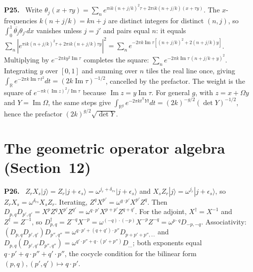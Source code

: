 \documentclass[11pt]{article}
\newcommand{\R}{\mathbb{R}}
\newenvironment{solution}[1]{\medskip\noindent\textbf{P#1.}\ }{\par\medskip}
\begin{document}
\begin{solution}{25}
Write $\theta_j(x+\tau y) = \sum_n e^{\pi ik(n+j/k)^2\tau+2\pi ik(n+j/k)(x+\tau y)}$.
The $x$-frequencies $k(n+j/k) = kn+j$ are distinct integers for distinct
$(n,j)$, so $\int_0^1\overline{\theta_j}\theta_{j'}dx$ vanishes unless $j = j'$
and pairs equal $n$: it equals $\sum_n|e^{\pi ik(n+j/k)^2\tau+2\pi ik(n+j/k)\tau y}|^2
= \sum_n e^{-2\pi k\operatorname{Im}\tau[(n+j/k)^2+2(n+j/k)y]}$. Multiplying by
$e^{-2\pi k y^2\operatorname{Im}\tau}$ completes the square:
$\sum_ne^{-2\pi k\operatorname{Im}\tau\,(n+j/k+y)^2}$. Integrating $y$ over $[0,1]$
and summing over $n$ tiles the real line once, giving
$\int_\R e^{-2\pi k\operatorname{Im}\tau\,t^2}dt = (2k\operatorname{Im}\tau)^{-1/2}$,
cancelled by the prefactor. The weight is the square of
$e^{-\pi k(\operatorname{Im}z)^2/\operatorname{Im}\tau}$ because
$\operatorname{Im}z = y\operatorname{Im}\tau$. For general $g$, with
$z = x+\Omega y$ and $Y = \operatorname{Im}\Omega$, the same steps give
$\int_{\R^g}e^{-2\pi k t^{\mathsf T}Yt}dt = (2k)^{-g/2}(\det Y)^{-1/2}$, hence
the prefactor $(2k)^{g/2}\sqrt{\det Y}$.
\end{solution}

\section*{The geometric operator algebra (Section~12)}

\begin{solution}{26}
$Z_rX_s|j\rangle = Z_r|j+\epsilon_s\rangle = \omega^{j_r+\delta_{rs}}|j+\epsilon_s\rangle$
and $X_sZ_r|j\rangle = \omega^{j_r}|j+\epsilon_s\rangle$, so $Z_rX_s = \omega^{\delta_{rs}}X_sZ_r$.
Iterating, $Z^qX^{p'} = \omega^{q\cdot p'}X^{p'}Z^q$. Then
$D_{p,q}D_{p',q'} = X^pZ^qX^{p'}Z^{q'} = \omega^{q\cdot p'}X^{p+p'}Z^{q+q'}$.
For the adjoint, $X^\dagger = X^{-1}$ and $Z^\dagger = Z^{-1}$, so
$D_{p,q}^\dagger = Z^{-q}X^{-p} = \omega^{(-q)\cdot(-p)}X^{-p}Z^{-q} = \omega^{p\cdot q}D_{-p,-q}$.
Associativity: $(D_{p,q}D_{p',q'})D_{p'',q''} = \omega^{q\cdot p'+(q+q')\cdot p''}D_{p+p'+p'',\dots}$
and $D_{p,q}(D_{p',q'}D_{p'',q''}) = \omega^{q'\cdot p''+q\cdot(p'+p'')}D_{\dots}$;
both exponents equal $q\cdot p'+q\cdot p''+q'\cdot p''$, the cocycle
condition for the bilinear form $(p,q),(p',q')\mapsto q\cdot p'$.
\end{solution}
\end{document}
